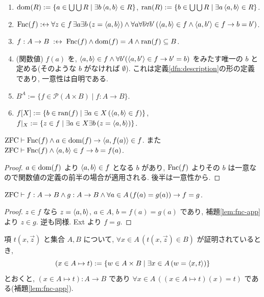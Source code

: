 \begin{dfn}[関係と関数]
  \begin{enumerate}[label=(\arabic*)]
    \item $\mathrm{dom}(R) := \{a \in \bigcup\bigcup R \mid \exists b\, \langle a,b\rangle \in R\}$, \quad $\mathrm{ran}(R) := \{b \in \bigcup\bigcup R \mid \exists a\, \langle a,b\rangle \in R\}$.
    \item $\mathrm{Fnc}(f) :\leftrightarrow \forall z \in f\, \exists a \exists b\, (z = \langle a,b\rangle) \land \forall a\forall b\forall b'\,(\langle a,b\rangle \in f \land \langle a,b'\rangle \in f \to b = b')$.
    \item $f : A \to B \;:\leftrightarrow\; \mathrm{Fnc}(f) \land \mathrm{dom}(f) = A \land \mathrm{ran}(f) \subseteq B$.
    \item (関数値) $f(a)$ を, $\langle a,b\rangle \in f \land \forall b'(\langle a,b'\rangle \in f \to b' = b)$ をみたす唯一の $b$ と定める(そのような $b$ がなければ $\emptyset$). これは定義\ref{dfn:description}の形の定義であり, 一意性は自明である.
    \item $B^A := \{f \in \mathcal{P}(A \times B) \mid f : A \to B\}$.
    \item $f[X] := \{b \in \mathrm{ran}(f) \mid \exists a \in X\, (\langle a,b\rangle \in f)\}$, \quad $f|_X := \{z \in f \mid \exists a \in X \exists b\,(z = \langle a,b\rangle)\}$.
  \end{enumerate}
\end{dfn}

\begin{lem}\label{lem:fnc-app}
  $\mathrm{ZFC} \vdash \mathrm{Fnc}(f) \land a \in \mathrm{dom}(f) \to \langle a,f(a)\rangle \in f$. また $\mathrm{ZFC} \vdash \mathrm{Fnc}(f) \land \langle a,b\rangle \in f \to b = f(a)$.
\end{lem}
\begin{proof}
  $a \in \mathrm{dom}(f)$ より $\langle a,b\rangle \in f$ となる $b$ があり, $\mathrm{Fnc}(f)$ よりその $b$ は一意なので関数値の定義の前半の場合が適用される. 後半は一意性から.
\end{proof}

\begin{thm}[関数の外延性]\label{thm:fnc-ext}
  $\mathrm{ZFC} \vdash f : A \to B \land g : A \to B \land \forall a \in A\,(f(a) = g(a)) \to f = g$.
\end{thm}
\begin{proof}
  $z \in f$ なら $z = \langle a,b\rangle$, $a \in A$, $b = f(a) = g(a)$ であり, 補題\ref{lem:fnc-app}より $z \in g$. 逆も同様. Ext より $f = g$.
\end{proof}

\begin{dfn}[関数の定義の仕方]\label{dfn:lambda}
  項 $t(x, \vec z)$ と集合 $A, B$ について, $\forall x \in A\,(t(x,\vec z) \in B)$ が証明されているとき,
  \[ (x \in A \mapsto t) := \{w \in A \times B \mid \exists x \in A\,(w = \langle x,t\rangle)\} \]
  とおくと, $(x \in A \mapsto t) : A \to B$ であり $\forall x \in A\,((x \in A \mapsto t)(x) = t)$ である(補題\ref{lem:fnc-app}).
\end{dfn}

